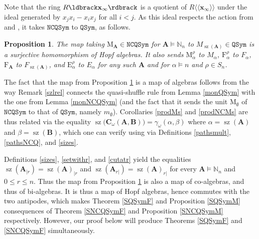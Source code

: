 \documentclass{article}
\newtheorem{prop}[thm]{Proposition}
\theoremstyle{definition}
\begin{document}
Note that the ring $R\ldbrack\mathbf{x}_{\infty}\rdbrack$ is a quotient of $R\langle\langle\mathbf{x}_{\infty}\rangle\rangle$ under the ideal generated by $x_{j}x_{i}-x_{i}x_{j}$ for all $i<j$. As this ideal respects the action from \cite{[Hi1]} and \cite{[Hi2]}, it takes $\mathtt{NCQSym}$ to $\mathtt{QSym}$, as follows.
\begin{prop}
The map taking $\mathrm{M}_{\mathbf{A}}\in\mathtt{NCQSym}$ for $\mathbf{A}\vDash\mathbb{N}_{n}$ to $M_{\operatorname{sz}(\mathbf{A})}\in\mathtt{QSym}$ is a surjective homomorphism of Hopf algebras. It also sends $\mathrm{M}_{\alpha}^{\rho}$ to $M_{\alpha}$, $\mathrm{F}_{\alpha}^{\rho}$ to $F_{\alpha}$, $\mathrm{F}_{\mathbf{A}}$ to $F_{\operatorname{sz}(\mathbf{A})}$, and $\mathrm{E}_{\alpha}^{\rho}$ to $E_{\alpha}$ for any such $\mathbf{A}$ and for $\alpha \vDash n$ and $\rho \in S_{n}$. \label{projQSym}
\end{prop}
The fact that the map from Proposition \ref{projQSym} is a map of algebras follows from the way Remark \ref{szlrel} connects the quasi-shuffle rule from Lemma \ref{monQSym} with the one from Lemma \ref{monNCQSym} (and the fact that it sends the unit $\mathrm{M}_{\emptyset}$ of $\mathtt{NCQSym}$ to that of $\mathtt{QSym}$, namely $m_{\emptyset}$). Corollaries \ref{prodMs} and \ref{prodNCMs} are thus related via the equality $\operatorname{sz}\big(\mathbf{C}_{\omega}(\mathbf{A},\mathbf{B})\big)=\gamma_{\omega}(\alpha,\beta)$ where $\alpha=\operatorname{sz}(\mathbf{A})$ and $\beta=\operatorname{sz}(\mathbf{B})$, which one can verify using via Definitions \ref{pathsmult}, \ref{pathsNCQ}, and \ref{sizes}.

Definitions \ref{sizes}, \ref{setwithr}, and \ref{cutatr} yield the equalities $\operatorname{sz}(\mathbf{A}_{|r})=\operatorname{sz}(\mathbf{A})_{|r}$ and $\operatorname{sz}(\mathbf{A}_{r|})=\operatorname{sz}(\mathbf{A})_{r|}$ for every $\mathbf{A}\vDash\mathbb{N}_{n}$ and $0 \leq r \leq n$. Thus the map from Proposition \ref{projQSym} is also a map of co-algebras, and thus of bi-algebras. It is thus a map of Hopf algebras, hence commutes with the two antipodes, which makes Theorem \ref{SQSymF} and Proposition \ref{SQSymM} consequences of Theorem \ref{SNCQSymF} and Proposition \ref{SNCQSymM} respectively. However, our proof below will produce Theorems \ref{SQSymF} and \ref{SNCQSymF} simultaneously.
\end{document}
